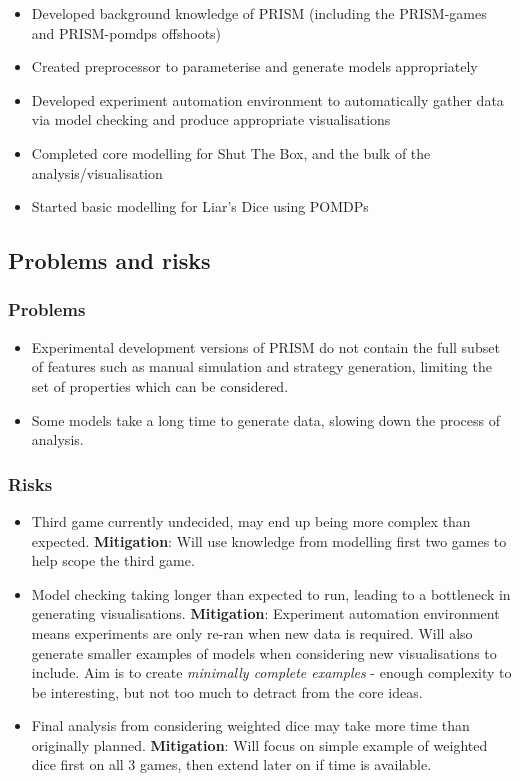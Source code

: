 \documentclass[11pt]{article}
\begin{document}
\begin{itemize}
    \item Developed background knowledge of PRISM (including the PRISM-games and PRISM-pomdps offshoots)
    \item Created preprocessor to parameterise and generate models appropriately
    \item Developed experiment automation environment to automatically gather data via model checking and produce appropriate visualisations
    \item Completed core modelling for Shut The Box, and the bulk of the analysis/visualisation
    \item Started basic modelling for Liar's Dice using POMDPs
\end{itemize}

\subsection{Problems and risks}\label{problems-and-risks}

\subsubsection{Problems}\label{problems}


\begin{itemize}
\item Experimental development versions of PRISM do not contain the full subset of features such as manual simulation and strategy generation, limiting the set of properties which can be considered.
\item Some models take a long time to generate data, slowing down the process of analysis.
\end{itemize}

\subsubsection{Risks}\label{risks}

\begin{itemize}

\item Third game currently undecided, may end up being more complex than expected. \textbf{Mitigation}: Will use knowledge from modelling first two games to help scope the third game.
\item Model checking taking longer than expected to run, leading to a bottleneck in generating visualisations. \textbf{Mitigation}: Experiment automation environment means experiments are only re-ran when new data is required. Will also generate smaller examples of models when considering new visualisations to include. Aim is to create \emph{minimally complete examples} - enough complexity to be interesting, but not too much to detract from the core ideas.
\item Final analysis from considering weighted dice may take more time than originally planned. \textbf{Mitigation}: Will focus on simple example of weighted dice first on all 3 games, then extend later on if time is available.
\end{itemize}
\end{document}
